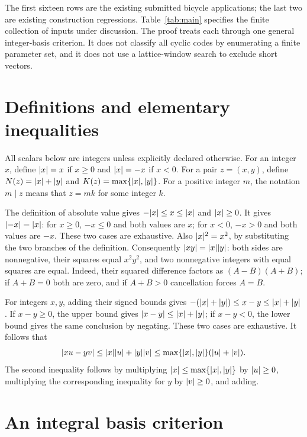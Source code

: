 \documentclass{article}
\DeclarePairedDelimiter{\abs}{\lvert}{\rvert}
\begin{document}
The first sixteen rows are the existing submitted bicycle applications; the
last two are existing construction regressions. Table~\ref{tab:main} specifies the
finite collection of inputs under discussion. The proof treats each through
one general integer-basis criterion. It does not classify all cyclic codes
by enumerating a finite parameter set, and it does not use a lattice-window
search to exclude short vectors.

\section{Definitions and elementary inequalities}\label{sec:definitions}

All scalars below are integers unless explicitly declared otherwise.
For an integer \(x\), define \(\abs{x}=x\) if \(x\ge0\) and \(\abs{x}=-x\) if \(x<0\).
For a pair \(z=(x,y)\), define \(N(z)=\abs{x}+\abs{y}\) and
\(K(z)=\max\{\abs{x},\abs{y}\}\). For a positive integer \(m\), the notation \(m\mid z\)
means that \(z=mk\) for some integer \(k\).

The definition of absolute value gives \(-\abs{x}\le x\le\abs{x}\) and
\(\abs{x}\ge0\). It gives \(\abs{-x}=\abs{x}\): for \(x\ge0\), \(-x\le0\) and both values
are \(x\); for \(x<0\), \(-x>0\) and both values are \(-x\). These two cases
are exhaustive. Also \(\abs{x}^2=x^2\), by substituting the two branches of
the definition. Consequently \(\abs{xy}=\abs{x}\abs{y}\): both sides are nonnegative,
their squares equal \(x^2y^2\), and two nonnegative integers with equal
squares are equal. Indeed, their squared difference factors as
\((A-B)(A+B)\); if \(A+B=0\) both are zero, and if \(A+B>0\) cancellation
forces \(A=B\).

For integers \(x,y\), adding their signed bounds gives
\(-(\abs{x}+\abs{y})\le x-y\le\abs{x}+\abs{y}\). If \(x-y\ge0\), the upper bound gives
\(\abs{x-y}\le\abs{x}+\abs{y}\); if \(x-y<0\), the lower bound gives the same conclusion
by negating. These two cases are exhaustive. It follows that
\begin{equation}\label{eq:triangle}
  \abs{xu-yv}\le \abs{x}\abs{u}+\abs{y}\abs{v}
  \le\max\{\abs{x},\abs{y}\}(\abs{u}+\abs{v}).
\end{equation}
The second inequality follows by multiplying \(\abs{x}\le\max\{\abs{x},\abs{y}\}\)
by \(\abs{u}\ge0\), multiplying the corresponding inequality for \(y\) by
\(\abs{v}\ge0\), and adding.

\section{An integral basis criterion}\label{sec:criterion}
\end{document}
